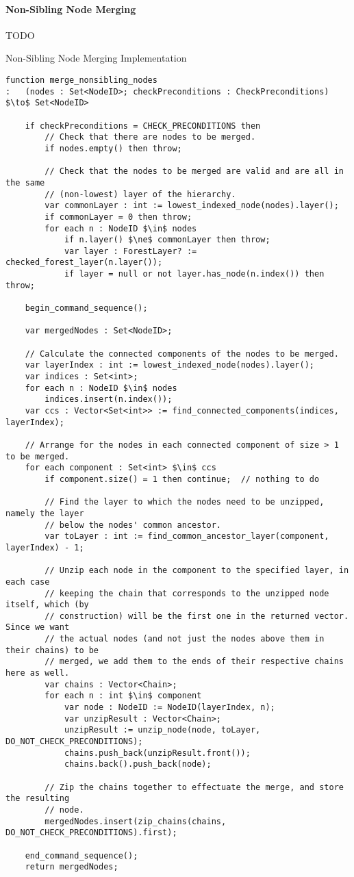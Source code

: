 \paragraph{Non-Sibling Node Merging}

TODO

\begin{stulisting}[p]
\caption{Non-Sibling Node Merging Implementation}
\label{code:ipfs-forest-mergenonsiblingnodes}
\begin{lstlisting}[style=Default]
function merge_nonsibling_nodes
:	(nodes : Set<NodeID>; checkPreconditions : CheckPreconditions) $\to$ Set<NodeID>

	if checkPreconditions = CHECK_PRECONDITIONS then
		// Check that there are nodes to be merged.
		if nodes.empty() then throw;

		// Check that the nodes to be merged are valid and are all in the same
		// (non-lowest) layer of the hierarchy.
		var commonLayer : int := lowest_indexed_node(nodes).layer();
		if commonLayer = 0 then throw;
		for each n : NodeID $\in$ nodes
			if n.layer() $\ne$ commonLayer then throw;
			var layer : ForestLayer? := checked_forest_layer(n.layer());
			if layer = null or not layer.has_node(n.index()) then throw;

	begin_command_sequence();

	var mergedNodes : Set<NodeID>;

	// Calculate the connected components of the nodes to be merged.
	var layerIndex : int := lowest_indexed_node(nodes).layer();
	var indices : Set<int>;
	for each n : NodeID $\in$ nodes
		indices.insert(n.index());
	var ccs : Vector<Set<int>> := find_connected_components(indices, layerIndex);

	// Arrange for the nodes in each connected component of size > 1 to be merged.
	for each component : Set<int> $\in$ ccs
		if component.size() = 1 then continue;	// nothing to do

		// Find the layer to which the nodes need to be unzipped, namely the layer
		// below the nodes' common ancestor.
		var toLayer : int := find_common_ancestor_layer(component, layerIndex) - 1;

		// Unzip each node in the component to the specified layer, in each case
		// keeping the chain that corresponds to the unzipped node itself, which (by
		// construction) will be the first one in the returned vector. Since we want
		// the actual nodes (and not just the nodes above them in their chains) to be
		// merged, we add them to the ends of their respective chains here as well.
		var chains : Vector<Chain>;
		for each n : int $\in$ component
			var node : NodeID := NodeID(layerIndex, n);
			var unzipResult : Vector<Chain>;
			unzipResult := unzip_node(node, toLayer, DO_NOT_CHECK_PRECONDITIONS);
			chains.push_back(unzipResult.front());
			chains.back().push_back(node);

		// Zip the chains together to effectuate the merge, and store the resulting
		// node.
		mergedNodes.insert(zip_chains(chains, DO_NOT_CHECK_PRECONDITIONS).first);

	end_command_sequence();
	return mergedNodes;
\end{lstlisting}
\end{stulisting}

